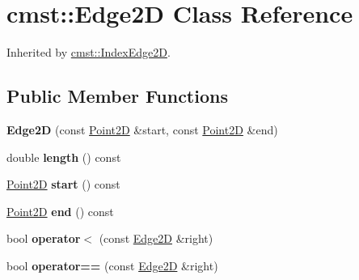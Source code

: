 \hypertarget{classcmst_1_1_edge2_d}{}\section{cmst\+:\+:Edge2D Class Reference}
\label{classcmst_1_1_edge2_d}


Inherited by \hyperlink{classcmst_1_1_index_edge2_d}{cmst\+::\+Index\+Edge2D}.

\subsection*{Public Member Functions}
\begin{DoxyCompactItemize}
\item 
{\bfseries Edge2D} (const \hyperlink{classcmst_1_1_point2_d}{Point2D} \&start, const \hyperlink{classcmst_1_1_point2_d}{Point2D} \&end)\hypertarget{classcmst_1_1_edge2_d_a0d1166315f84757395e889d3225e2ae0}{}\label{classcmst_1_1_edge2_d_a0d1166315f84757395e889d3225e2ae0}

\item 
double {\bfseries length} () const \hypertarget{classcmst_1_1_edge2_d_adaa859c8f6b412e1174abe8d8b429ce9}{}\label{classcmst_1_1_edge2_d_adaa859c8f6b412e1174abe8d8b429ce9}

\item 
\hyperlink{classcmst_1_1_point2_d}{Point2D} {\bfseries start} () const \hypertarget{classcmst_1_1_edge2_d_ad77218c63818fe92f43033ba1487ab89}{}\label{classcmst_1_1_edge2_d_ad77218c63818fe92f43033ba1487ab89}

\item 
\hyperlink{classcmst_1_1_point2_d}{Point2D} {\bfseries end} () const \hypertarget{classcmst_1_1_edge2_d_af02d43d8344759ac3709d318e26cdcee}{}\label{classcmst_1_1_edge2_d_af02d43d8344759ac3709d318e26cdcee}

\item 
bool {\bfseries operator$<$} (const \hyperlink{classcmst_1_1_edge2_d}{Edge2D} \&right)\hypertarget{classcmst_1_1_edge2_d_a58bd75e0a118f5192f5811cfacb6e7ac}{}\label{classcmst_1_1_edge2_d_a58bd75e0a118f5192f5811cfacb6e7ac}

\item 
bool {\bfseries operator==} (const \hyperlink{classcmst_1_1_edge2_d}{Edge2D} \&right)\hypertarget{classcmst_1_1_edge2_d_a1609ff699d629d691bf054acd2deb187}{}\label{classcmst_1_1_edge2_d_a1609ff699d629d691bf054acd2deb187}

\end{DoxyCompactItemize}
